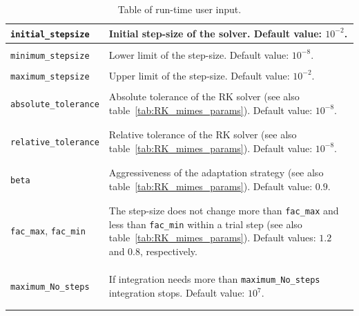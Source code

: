 \documentclass[11pt,a4paper]{article}
\begin{document}
\begin{table}[h!]
\begin{tabular}{l l}
		{\tt initial\_stepsize} &  Initial step-size of the solver. Default value: $10^{-2}$.\\ 
		\hline\\[-0.4cm]

		{\tt minimum\_stepsize} & Lower limit of the step-size. Default value:  $10^{-8}$.\\
		\hline\\[-0.4cm]

		{\tt maximum\_stepsize} & Upper limit of the step-size. Default value:  $10^{-2}$.\\
		\hline\\[-0.4cm]

		{\tt absolute\_tolerance} & \multirow{1}{12cm}{Absolute tolerance of the RK solver	(see also table~\ref{tab:RK_mimes_params}).  Default value:  $10^{-8}$.}\\\\
		\hline\\[-0.4cm]

		{\tt relative\_tolerance} & \multirow{1}{12cm}{Relative tolerance of the RK solver	(see also table~\ref{tab:RK_mimes_params}).  Default value:  $10^{-8}$.}\\\\
		\hline\\[-0.4cm]
		
		{\tt beta} & \multirow{1}{12cm}{Aggressiveness of the adaptation strategy	(see also table~\ref{tab:RK_mimes_params}).  Default value:  $0.9$.}\\\\
		\hline\\[-0.4cm]

		{\tt fac\_max}, {\tt fac\_min} &\multirow{1}{12cm}{The step-size does not change more than {\tt fac\_max} and less than {\tt fac\_min} within a trial step (see also table~\ref{tab:RK_mimes_params}). Default values: $1.2$ and $0.8$, respectively.} \\ \\ \\ 
		\hline\\[-0.4cm]
		
		{\tt maximum\_No\_steps} & \multirow{1}{12cm}{If integration needs more than {\tt maximum\_No\_steps} integration stops. Default value: $10^7$.}\\\\
		\hline\\[-0.4cm]
	\end{tabular}
	\caption{Table of run-time user input.}
	\label{tab:run_time-input}
	\end{table}
		
\end{document}
